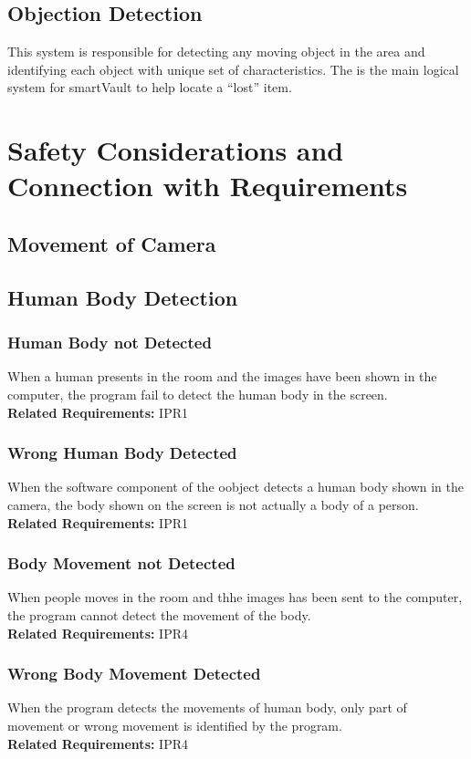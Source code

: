 \documentclass{article}
\begin{document}
\subsection{Objection Detection}
This system is responsible for detecting any moving object in the area and identifying each object with unique set of characteristics. The is the main logical system for smartVault to help locate a “lost” item. 
\section{Safety Considerations and Connection with Requirements}
\subsection{Movement of Camera}
\subsection{Human Body Detection}
\subsubsection{Human Body not Detected}
When a human presents in the room and the images have been shown in the computer, the program fail to detect the human body in the screen. \\
\textbf{Related Requirements: }IPR1
\subsubsection{Wrong Human Body Detected}
When the software component of the oobject detects a human body shown in the camera, the body shown on the screen is not actually a body of a person.\\
\textbf{Related Requirements: }IPR1
\subsubsection{Body Movement not Detected}
When people moves in the room and thhe images has been sent to the computer, the program cannot detect the movement of the body.\\
\textbf{Related Requirements: }IPR4
\subsubsection{Wrong Body Movement Detected}
When the program detects the movements of human body, only part of movement or wrong movement is identified by the program.\\
\textbf{Related Requirements: }IPR4
\end{document}
